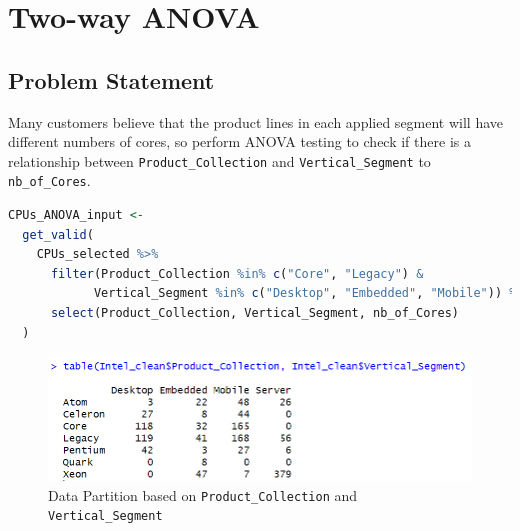 \section{Two-way ANOVA}
\subsection{Problem Statement}

Many customers believe that the product lines in each applied segment will have different numbers of cores, so perform ANOVA testing to check if there is a relationship between \texttt{Product\_Collection} and \texttt{Vertical\_Segment} to \texttt{nb\_of\_Cores}.

\begin{lstlisting}[language = R]
  CPUs_ANOVA_input <-
  get_valid(
    CPUs_selected %>%
      filter(Product_Collection %in% c("Core", "Legacy") &
            Vertical_Segment %in% c("Desktop", "Embedded", "Mobile")) %>%
      select(Product_Collection, Vertical_Segment, nb_of_Cores)
  ) 
\end{lstlisting}

\begin{figure}[ht]
  \centering
  \includegraphics[width=14cm]{img/1.png}
  \vspace{0.5cm}
  \caption{Data Partition based on \texttt{Product\_Collection} and \texttt{Vertical\_Segment}}
\end{figure}

